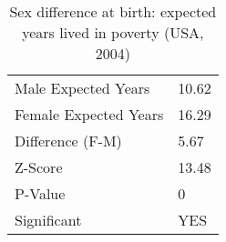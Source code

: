 \begin{table}

\caption{Sex difference at birth: expected years lived in poverty (USA, 2004)}
\centering
\begin{tabular}[t]{ll}
\toprule
 & \\
\midrule
Male Expected Years & 10.62\\
Female Expected Years & 16.29\\
Difference (F-M) & 5.67\\
Z-Score & 13.48\\
P-Value & 0\\
\addlinespace
Significant & YES\\
\bottomrule
\end{tabular}
\end{table}
